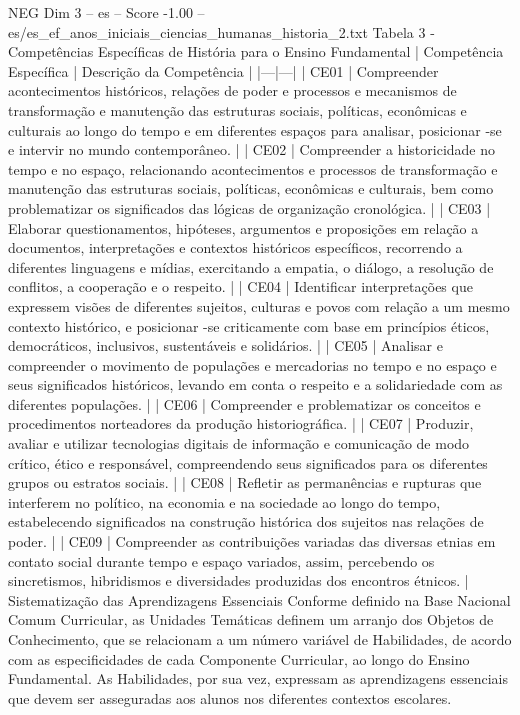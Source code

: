 \begin{textsample}{NEG Dim 3 – es – Score -1.00 – es/es\_ef\_anos\_iniciais\_ciencias\_humanas\_historia\_2.txt}
Tabela 3 - Competências Específicas de História para o Ensino Fundamental | Competência Específica | Descrição da Competência | |---|---| | CE01 | Compreender acontecimentos históricos, relações de poder e processos e mecanismos de transformação e manutenção das estruturas sociais, políticas, econômicas e culturais ao longo do tempo e em diferentes espaços para analisar, posicionar -se e intervir no mundo contemporâneo. | | CE02 | Compreender a historicidade no tempo e no espaço, relacionando acontecimentos e processos de transformação e manutenção das estruturas sociais, políticas, econômicas e culturais, bem como problematizar os significados das lógicas de organização cronológica. | | CE03 | Elaborar questionamentos, hipóteses, argumentos e proposições em relação a documentos, interpretações e contextos históricos específicos, recorrendo a diferentes linguagens e mídias, exercitando a empatia, o diálogo, a resolução de conflitos, a cooperação e o respeito. | | CE04 | Identificar interpretações que expressem visões de diferentes sujeitos, culturas e povos com relação a um mesmo contexto histórico, e posicionar -se criticamente com base em princípios éticos, democráticos, inclusivos, sustentáveis e solidários. | | CE05 | Analisar e compreender o movimento de populações e mercadorias no tempo e no espaço e seus significados históricos, levando em conta o respeito e a solidariedade com as diferentes populações. | | CE06 | Compreender e problematizar os conceitos e procedimentos norteadores da produção historiográfica. | | CE07 | Produzir, avaliar e utilizar tecnologias digitais de informação e comunicação de modo crítico, ético e responsável, compreendendo seus significados para os diferentes grupos ou estratos sociais. | | CE08 | Refletir as permanências e rupturas que interferem no político, na economia e na sociedade ao longo do tempo, estabelecendo significados na construção histórica dos sujeitos nas relações de poder. | | CE09 | Compreender as contribuições variadas das diversas etnias em contato social durante tempo e espaço variados, assim, percebendo os sincretismos, hibridismos e diversidades produzidas dos encontros étnicos. | Sistematização das Aprendizagens Essenciais Conforme definido na Base Nacional Comum Curricular, as Unidades Temáticas definem um arranjo dos Objetos de Conhecimento, que se relacionam a um número variável de Habilidades, de acordo com as especificidades de cada Componente Curricular, ao longo do Ensino Fundamental.
As Habilidades, por sua vez, expressam as aprendizagens essenciais que devem ser asseguradas aos alunos nos diferentes contextos escolares.

\end{textsample}
